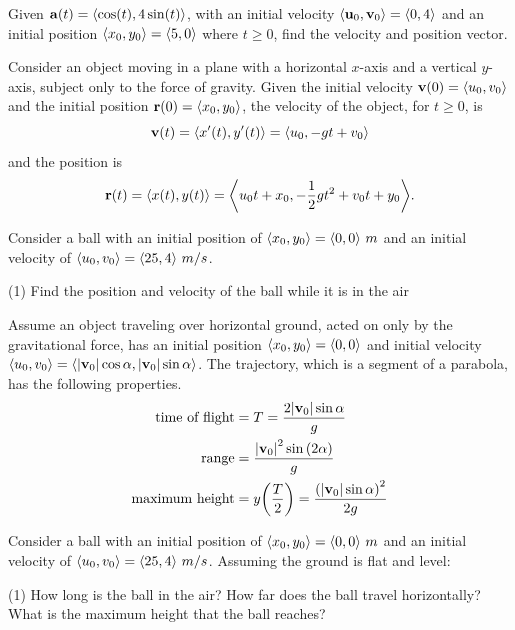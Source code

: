 \documentclass[mathNotesPreamble]{subfiles}
\begin{document}
  \begin{ex*}
    Given $\mathbf a(t)={\left\langle \cos(t),4\sin(t) \right\rangle}$, with an initial velocity ${\left\langle {\mathbf{u}}_0,{\mathbf{v}}_0 \right\rangle}={\left\langle 0,4 \right\rangle}$ and an initial position ${\left\langle x_0,y_0 \right\rangle}={\left\langle 5,0 \right\rangle}$ where $t\geq 0$, find the velocity and position vector.
  \end{ex*}
  \pagebreak

  \begin{thmBox*}
    Consider an object moving in a plane with a horizontal $x$-axis and a vertical $y$-axis, subject only to the force of gravity. Given the initial velocity ${\mathbf{v}}(0)={\left\langle u_0,v_0 \right\rangle}$ and the initial position ${\mathbf{r}}(0)={\left\langle x_0,y_0 \right\rangle}$, the velocity of the object, for $t\geq 0$, is
      \[{\mathbf{v}}(t)={\left\langle x'(t), y'(t) \right\rangle}={\left\langle u_0,-gt+v_0 \right\rangle}\]
    and the position is
      \[{\mathbf{r}}(t)={\left\langle x(t),y(t) \right\rangle}={\left\langle u_0t+x_0,-\frac{1}{2}gt^2+v_0t+y_0 \right\rangle}.\]
  \end{thmBox*}

  \begin{ex*}
    Consider a ball with an initial position of ${\left\langle x_0,y_0 \right\rangle}={\left\langle 0,0 \right\rangle}\ m$ and an initial velocity of ${\left\langle u_0,v_0 \right\rangle}={\left\langle 25,4 \right\rangle}\ m/s$.
  \end{ex*}
  \begin{tasks}[after-item-skip=\stretch{1}](1)
    \task Find the position and velocity of the ball while it is in the air
  \end{tasks}


  \begin{thmBox*}
    Assume an object traveling over horizontal ground, acted on only by the gravitational force, has an initial position ${\left\langle x_0,y_0 \right\rangle}={\left\langle 0,0 \right\rangle}$ and initial velocity ${\left\langle u_0,v_0 \right\rangle}={\left\langle {\left\vert{\mathbf{v}}_0\right\vert}\cos\alpha, {\left\vert{\mathbf{v}}_0\right\vert}\sin\alpha \right\rangle}$. The trajectory, which is a segment of a parabola, has the following properties.
    \begin{align*}
      \textnormal{time of flight}&= T= \frac{2{\left\vert{\mathbf{v}}_0\right\vert}\sin\alpha}{g}\\
      \textnormal{range}&=\frac{{\left\vert{\mathbf{v}}_0\right\vert}^2\sin{\left(2\alpha\right)}}{g}\\
      \textnormal{maximum height}&=y{\left(\frac{T}{2}\right)}=\frac{{\left({\left\vert{\mathbf{v}}_0\right\vert}\sin\alpha\right)}^2}{2g}
    \end{align*}
  \end{thmBox*}

  \pagebreak
  \begin{ex*}
    Consider a ball with an initial position of ${\left\langle x_0,y_0 \right\rangle}={\left\langle 0,0 \right\rangle}\ m$ and an initial velocity of ${\left\langle u_0,v_0 \right\rangle}={\left\langle 25,4 \right\rangle}\ m/s$. Assuming the ground is flat and level:
  \end{ex*}
  \begin{tasks}[after-item-skip=\stretch{1}, resume](1)
    \task How long is the ball in the air?
    \task How far does the ball travel horizontally? 
    \task What is the maximum height that the ball reaches?
  \end{tasks}
  \pagebreak
  
\end{document}
